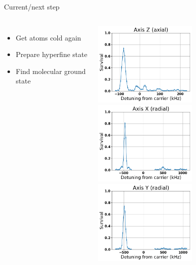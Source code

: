 \documentclass{beamer}
\begin{document}
\begin{frame}{Current/next step}
  \begin{columns}
    \column{6cm}
    \begin{itemize}
    \item Get atoms cold again
    \item Prepare hyperfine state
    \item Find molecular ground state
    \end{itemize}
    \includegraphics[width=5cm]{../../experiments/na_rsc_201709/imgs/data_20170917_220050_az.png}
    \column{6cm}
    \includegraphics[width=5cm]{../../experiments/na_rsc_201709/imgs/data_20170917_220050_rx.png}\\
    \includegraphics[width=5cm]{../../experiments/na_rsc_201709/imgs/data_20170917_220050_ry.png}
  \end{columns}
\end{frame}
\end{document}
